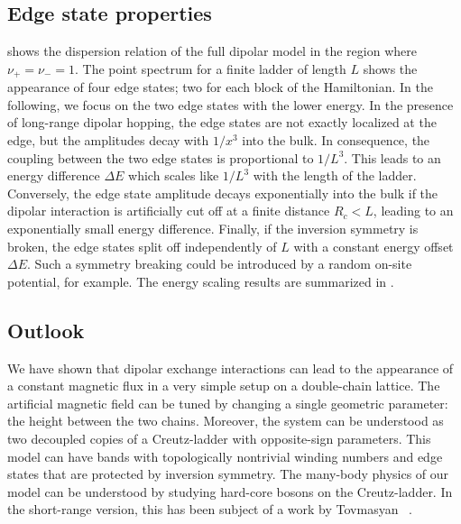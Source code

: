 \subsection{Edge state properties}


 shows the dispersion relation of the full dipolar model in the region where $\nu_+ = \nu_- = 1$.
The point spectrum for a finite ladder of length $L$ shows the appearance of four edge states; two for each block of the Hamiltonian.
In the following, we focus on the two edge states with the lower energy.
In the presence of long-range dipolar hopping, the edge states are not exactly localized at the edge, but the amplitudes decay with $1/x^3$ into the bulk.
In consequence, the coupling between the two edge states is proportional to $1/L^3$.
This leads to an energy difference $\Delta E$ which scales like $1/L^3$ with the length of the ladder.
Conversely, the edge state amplitude decays exponentially into the bulk if the dipolar interaction is artificially cut off at a finite distance $R_c < L$, leading to an exponentially small energy difference.
Finally, if the inversion symmetry is broken, the edge states split off independently of $L$ with a constant energy offset $\Delta E$.
Such a symmetry breaking could be introduced by a random on-site potential, for example.
The energy scaling results are summarized in .

\subsection{Outlook}
We have shown that dipolar exchange interactions can lead to the appearance of a constant magnetic flux in a very simple setup on a double-chain lattice.
The artificial magnetic field can be tuned by changing a single geometric parameter: the height between the two chains.
Moreover, the system can be understood as two decoupled copies of a Creutz-ladder with opposite-sign parameters.
This model can have bands with topologically nontrivial winding numbers and edge states that are protected by inversion symmetry.
The many-body physics of our model can be understood by studying hard-core bosons on the Creutz-ladder.
In the short-range version, this has been subject of a work by Tovmasyan \etal~\cite{Tovmasyan2013a}.

